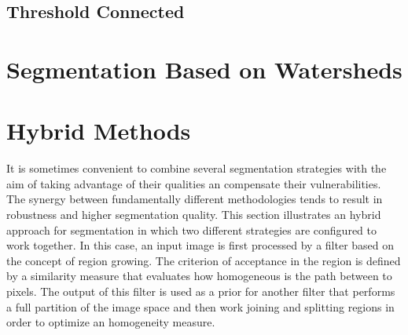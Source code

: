 \subsection{Threshold Connected}

\section{Segmentation Based on Watersheds}
\label{sec:WatershedSegmentation}






\section{Hybrid Methods} 
\label{sec:HybridSegmentationMethods}

It is sometimes convenient to combine several segmentation strategies with the
aim of taking advantage of their qualities an compensate their vulnerabilities.
The synergy between fundamentally different methodologies tends to result in
robustness and higher segmentation quality.  This section illustrates an hybrid
approach for segmentation in which two different strategies are configured to
work together. In this case, an input image is first processed by a filter
based on the concept of region growing. The criterion of acceptance in the
region is defined by a similarity measure that evaluates how homogeneous is the
path between to pixels. The output of this filter is used as a prior for
another filter that performs a full partition of the image space and then work
joining and splitting regions in order to optimize an homogeneity measure.





